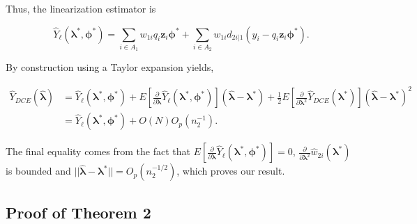\documentclass[12pt]{article}
\renewcommand{\bf}[1]{\mathbf{#1}}
\begin{document}
Thus, the linearization estimator is

$$\hat Y_\ell(\bm \lambda^*, \bm \phi^*) = 
\sum_{i \in A_1} w_{1i} q_i \bf z_i \bm \phi^* +
\sum_{i \in A_2} w_{1i} d_{2i|1} (y_i - q_i \bf z_i \bm \phi^*).$$

By construction using a Taylor expansion yields,

\begin{align*}
  \hat Y_{DCE}(\hat{\bm \lambda}) 
  &= \hat Y_\ell(\bm \lambda^*, \bm \phi^*) + 
  E\left[\frac{\partial}{\partial \bm \lambda}\hat Y_\ell(\bm \lambda^*,
  \bm \phi^*)\right](\hat{\bm \lambda} - \bm \lambda^*) + \frac{1}{2}
  E\left[\frac{\partial}{\partial \bm \lambda^2} \hat Y_{DCE}(\bm \lambda^*)\right] 
  (\hat{\bm \lambda} - \bm \lambda^*)^2\\
  &= \hat Y_\ell(\bm \lambda^*, \bm \phi^*) + O(N)O_p(n_2^{-1}).
\end{align*}

The final equality comes from the fact that 
$E\left[\frac{\partial}{\partial \bm \lambda}
\hat Y_\ell(\bm \lambda^*, \bm \phi^*)\right] = 0$,
$\frac{\partial}{\partial \bm \lambda^2} \hat w_{2i}(\bm \lambda^*)$ is
bounded and $||\hat{\bm \lambda} - \bm \lambda^*|| = O_p(n_2^{-1/2})$, which
proves our result.

\subsection{Proof of Theorem 2}
\end{document}
